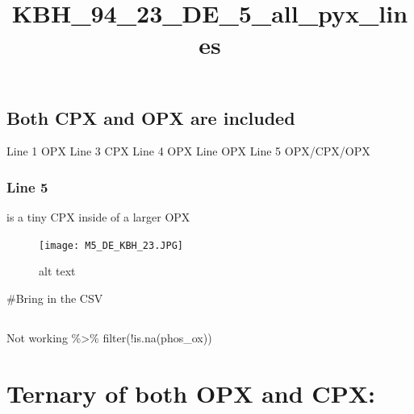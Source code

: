 \documentclass[
]{article}
\title{KBH\_94\_23\_DE\_5\_all\_pyx\_lines}
\author{}
\date{\vspace{-2.5em}}
\begin{document}
\maketitle

\hypertarget{both-cpx-and-opx-are-included}{%
\subsection{Both CPX and OPX are
included}\label{both-cpx-and-opx-are-included}}

Line 1 OPX Line 3 CPX Line 4 OPX Line OPX Line 5 OPX/CPX/OPX

\hypertarget{line-5}{%
\subsubsection{Line 5}\label{line-5}}

is a tiny CPX inside of a larger OPX

\begin{figure}
\centering
\texttt{[image: M5\_DE\_KBH\_23.JPG]}
\caption{alt text}
\end{figure}

\#Bring in the CSV

\hypertarget{section}{%
\subsection{}\label{section}}

Not working \%\textgreater\% filter(!is.na(phos\_ox))

\hypertarget{ternary-of-both-opx-and-cpx}{%
\section{Ternary of both OPX and
CPX:}\label{ternary-of-both-opx-and-cpx}}
\end{document}
